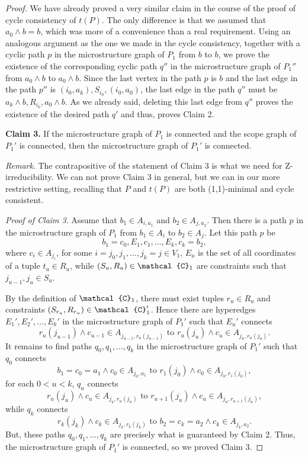 \documentclass[11pt]{amsart}
\newcommand{\vr}[1]{{\uppercase {\mathcal{#1}}}}
\newcommand{\mt}{\wedge}
\theoremstyle{definition}
\begin{document}
\begin{proof}
We have already proved a very similar claim in the course of the proof of cycle consistency of $t(P)$. The only difference is that we assumed that $a_0\mt b=b$, which was more of a convenience than a real requirement. Using an analogous argument as the one we made in the cycle consistency, together with a cyclic path $p$ in the microstructure graph of $P_1$ from $b$ to $b$, we prove the existence of the corresponding cyclic path $q''$ in the microstructure graph of $P_1''$ from $a_0\mt b$ to $a_0\mt b$. Since the last vertex in the path $p$ is $b$ and the last edge in the path $p''$ is $(i_0,a_k), S_{i_0},(i_0,a_0)$, the last edge in the path $q''$ must be $a_k\mt b, R_{i_0}, a_0\mt b$. As we already said, deleting this last edge from $q''$ proves the existence of the desired path $q'$ and thus, proves Claim 2.

{\bf Claim 3.} If the microstructure graph of $P_1$ is connected and the scope graph of $P_1'$ is connected, then the microstructure graph of $P_1'$ is connected.

{\em Remark}. The contrapositive of the statement of Claim 3 is what we need for Z-irreducibility. We can not prove Claim 3 in general, but we can in our more restrictive setting, recalling that $P$ and $t(P)$ are both (1,1)-minimal and cycle consistent.

{\em Proof of Claim 3}. Assume that $b_1\in A_{i,a_1}$ and $b_2\in A_{j,a_2}$. Then  there is a path $p$ in the microstructure graph of $P_1$ from $b_1\in A_i$ to $b_2\in A_j$. Let this path $p$ be
\[b_1=c_0,E_1,c_1,\dots, E_k,c_k=b_2,\]
where $c_i\in A_{j_i}$, for some $i=j_0,j_1,\dots,j_k=j\in V_1$, $E_u$ is the set of all coordinates of a tuple $t_u\in R_u$, while $(S_u,R_u)\in \vr c_1$ are constraints such that $j_{u-1},j_u\in S_u$.

By the definition of $\vr c_1$, there must exist tuples $r_u\in R_u$ and constraints $(S_{r_u},R_{r_u})\in\vr c_1'$. Hence there are hyperedges $E_1',E_2',\dots,E_k'$ in the microstructure graph of $P_1'$ such that $E_u'$ connects 
\[r_u(j_{u-1})\mt c_{u-1}\in A_{j_{u-1},r_u(j_{u-1})}\text{ to }r_u(j_u)\mt c_u\in A_{j_u,r_u(j_u)}.\]
It remains to find paths $q_0,q_1,\dots,q_k$ in the microstructure graph of $P_1'$ such that $q_0$ connects
\[b_1=c_0=a_1\mt c_0\in A_{j_0,a_1}\text{ to }r_1(j_0)\mt c_0\in A_{j_0,r_1(j_0)},\]
for each $0<u<k$, $q_u$ connects 
\[r_u(j_u)\mt c_u\in A_{j_u,r_u(j_u)}\text{ to }r_{u+1}(j_u)\mt c_u\in A_{j_u,r_{u+1}(j_u)},\]
while $q_k$ connects
\[r_k(j_k)\mt c_k\in A_{j_k,r_k(j_k)}\text{ to }b_2=c_k=a_2\mt c_k\in A_{j_k,a_2}.\]
But, these paths $q_0,q_1,\dots,q_k$ are precisely what is guaranteed by Claim 2. Thus, the microstructure graph of $P_1'$ is connected, so we proved Claim 3.


\end{proof}
\end{document}
